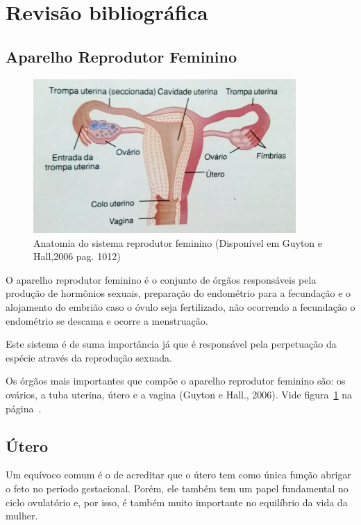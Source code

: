 \documentclass[12pt]{article} %
\begin{document}
\section{Revisão bibliográfica}

\subsection{Aparelho Reprodutor Feminino}
\begin{figure}[h!]
\centering
\includegraphics[width=10cm]{utero.jpg}
\caption[Anatomia do sistema reprodutor feminino]{Anatomia do sistema reprodutor feminino (Disponível em Guyton e Hall,2006 pag. 1012)}
\label{fig:aparelho feminino}
\end{figure}

O aparelho reprodutor feminino é o conjunto de órgãos responsáveis
pela produção de hormônios sexuais, preparação do
endométrio para a fecundação e o alojamento do embrião caso o óvulo seja
fertilizado, não ocorrendo a fecundação o endométrio se descama e ocorre a menstruação. 

Este sistema é de suma
importância já que é responsável pela perpetuação da espécie através
da reprodução sexuada.

Os órgãos mais importantes que compõe o
aparelho reprodutor feminino são: os ovários, a tuba uterina, útero e
a vagina (Guyton e Hall., 2006). Vide figura~\ref{fig:aparelho feminino}
na página~\pageref{fig:aparelho feminino}.



\subsection{Útero}

Um equívoco comum é o de acreditar que o útero tem como única função
abrigar o feto no período gestacional. Porém, ele também tem um papel
fundamental no ciclo ovulatório e, por isso, é também muito importante
no equilíbrio da vida da mulher.
\end{document}
